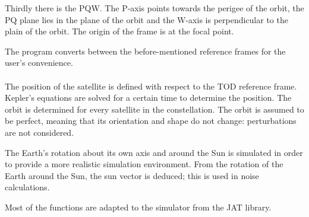 Thirdly there is the PQW. The P-axis points towards the perigee of the orbit, the PQ plane lies in the plane of the orbit and the W-axis is perpendicular to the plain of the orbit. The origin of the frame is at the focal point. 

The program converts between the before-mentioned reference frames for the user's convenience.\\\\
The position of the satellite is defined with respect to the \acs{TOD} reference frame. Kepler's equations are solved for a certain time to determine the position. The orbit is determined for every satellite in the constellation. The orbit is assumed to be perfect, meaning that its orientation and shape do not change: perturbations are not considered. 

The Earth's rotation about its own axis and around the Sun is simulated in order to provide a more realistic simulation environment. From the rotation of the Earth around the Sun, the sun vector is deduced; this is used in noise calculations.

Most of the functions are adapted to the simulator from the \ac{JAT} library. 